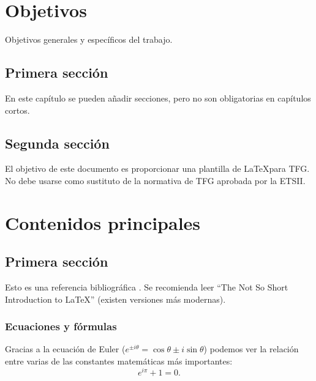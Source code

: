 \documentclass[12pt,twoside,titlepage]{report}
\newcommand\blankpage{%
    \newpage
    \null
    \thispagestyle{empty}%
    \newpage}
\begin{document}







\chapter{Objetivos}


Objetivos generales y específicos del trabajo.


\section{Primera sección}

En este capítulo se pueden añadir secciones, pero no son obligatorias en capítulos cortos.

\section{Segunda sección}

El objetivo de este documento es proporcionar una plantilla de \LaTeX para TFG. No debe usarse como sustituto de la normativa de TFG aprobada por la ETSII.


\blankpage






\chapter{Contenidos principales}
\label{chap:contenidos}




\section{Primera sección}

Esto es una referencia bibliográfica \cite{bibex}. Se recomienda leer ``The Not So Short Introduction to \LaTeX'' \cite{Oetiker2007} (existen versiones más modernas).


\subsection{Ecuaciones y fórmulas}

Gracias a la ecuación de Euler ($e^{ \pm i\theta } = \cos \theta \pm i\sin \theta$) podemos ver la relación entre varias de las constantes matemáticas más importantes:
\[
    e^{i\pi} + 1 = 0.
\]
\end{document}
